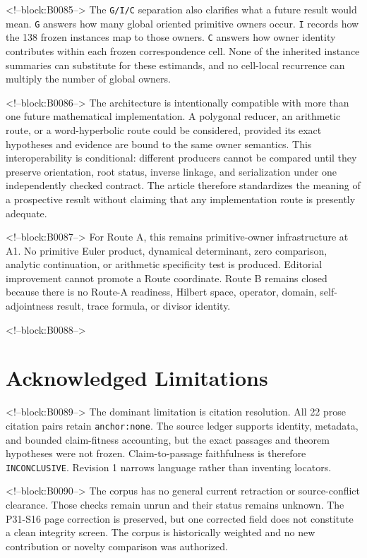 \documentclass[11pt]{article}
\begin{document}
<!--block:B0085-->
The \texttt{G/I/C} separation also clarifies what a future result would
mean. \texttt{G} answers how many global oriented primitive owners
occur. \texttt{I} records how the 138 frozen instances map to those
owners. \texttt{C} answers how owner identity contributes within each
frozen correspondence cell. None of the inherited instance summaries can
substitute for these estimands, and no cell-local recurrence can
multiply the number of global owners.

<!--block:B0086-->
The architecture is intentionally compatible with more than one future
mathematical implementation. A polygonal reducer, an arithmetic route,
or a word-hyperbolic route could be considered, provided its exact
hypotheses and evidence are bound to the same owner semantics. This
interoperability is conditional: different producers cannot be compared
until they preserve orientation, root status, inverse linkage, and
serialization under one independently checked contract. The article
therefore standardizes the meaning of a prospective result without
claiming that any implementation route is presently adequate.

<!--block:B0087-->
For Route A, this remains primitive-owner infrastructure at A1. No
primitive Euler product, dynamical determinant, zero comparison,
analytic continuation, or arithmetic specificity test is produced.
Editorial improvement cannot promote a Route coordinate. Route B remains
closed because there is no Route-A readiness, Hilbert space, operator,
domain, self-adjointness result, trace formula, or divisor identity.

<!--block:B0088-->
\hypertarget{8-acknowledged-limitations}{%
\section{Acknowledged
Limitations}\label{8-acknowledged-limitations}}

<!--block:B0089-->
The dominant limitation is citation resolution. All 22 prose citation
pairs retain \texttt{anchor:none}. The source ledger supports identity,
metadata, and bounded claim-fitness accounting, but the exact passages
and theorem hypotheses were not frozen. Claim-to-passage faithfulness is
therefore \texttt{INCONCLUSIVE}. Revision 1 narrows language rather than
inventing locators.

<!--block:B0090-->
The corpus has no general current retraction or source-conflict
clearance. Those checks remain unrun and their status remains unknown.
The P31-S16 page correction is
preserved, but one corrected field does not constitute a clean integrity
screen. The corpus is historically weighted and no new contribution or
novelty comparison was authorized.
\end{document}
